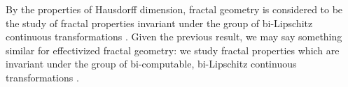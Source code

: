 By the properties of Hausdorff dimension, fractal geometry is considered to be the study of fractal properties invariant under the group of bi-Lipschitz continuous transformations \cite{Kle93}. Given the previous result, we may say something similar for effectivized fractal geometry: we study fractal properties which are invariant under the group of bi-computable, bi-Lipschitz continuous transformations \cite{Rei04}.